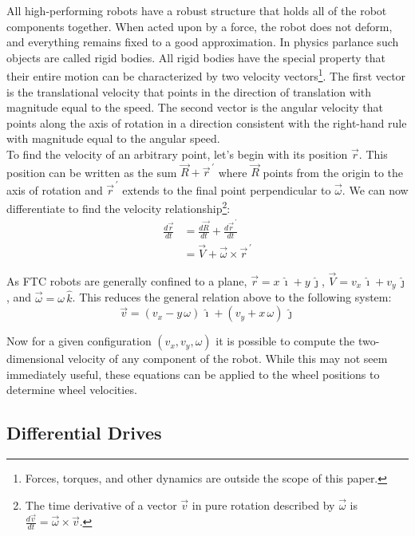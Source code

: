 \documentclass{article}
\newcommand{\cross}{\times}
\newcommand{\pvec}[1]{\vec{#1}^{\,\prime}}
\begin{document}
All high-performing robots have a robust structure that holds all of the robot components together. When acted upon by a force, the robot does not deform, and everything remains fixed to a good approximation. In physics parlance such objects are called rigid bodies. All rigid bodies have the special property that their entire motion can be characterized by two velocity vectors\footnote{Forces, torques, and other dynamics are outside the scope of this paper.}. The first vector is the translational velocity that points in the direction of translation with magnitude equal to the speed. The second vector is the angular velocity that points along the axis of rotation in a direction consistent with the right-hand rule with magnitude equal to the angular speed.\\

To find the velocity of an arbitrary point, let's begin with its position $\vec{r}$. This position can be written as the sum $\vec{R} + \pvec{r}$ where $\vec{R}$ points from the origin to the axis of rotation and $\pvec{r}$ extends to the final point perpendicular to $\vec{\omega}$. We can now differentiate to find the velocity relationship\footnote{The time derivative of a vector $\vec{v}$ in pure rotation described by $\vec{\omega}$ is $\frac{d\vec{v}}{dt} = \vec{\omega} \cross \vec{v}$.}:
\begin{align*}
    \frac{d\vec{r}}{dt} &= \frac{d\vec{R}}{dt} + \frac{d\pvec{r}}{dt} \\
                        &= \vec{V} + \vec{\omega} \cross \pvec{r}
\end{align*}

As FTC robots are generally confined to a plane, $\vec{r} = x \, \hat{\imath} + y \, \hat{\jmath}$, $\vec{V} = v_x \, \hat{\imath} + v_y \, \hat{\jmath}$, and $\vec{\omega} = \omega \, \hat{k}$. This reduces the general relation above to the following system:
$$
    \vec{v} = (v_x - y \, \omega) \, \hat{\imath} + (v_y + x \, \omega) \, \hat{\jmath}
$$

Now for a given configuration $(v_x, v_y, \omega)$ it is possible to compute the two-dimensional velocity of any component of the robot. While this may not seem immediately useful, these equations can be applied to the wheel positions to determine wheel velocities.


\subsection{Differential Drives}
\end{document}
